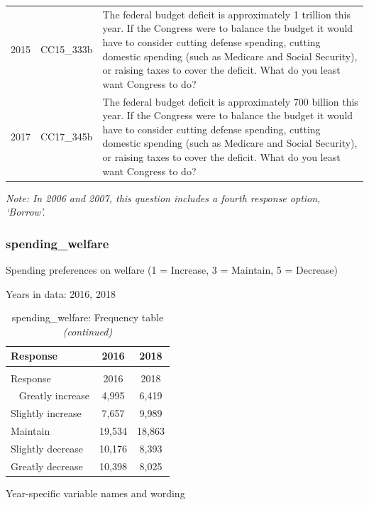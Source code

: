\documentclass[12pt]{article}
\begin{document}
\begin{longtable}[t]{rl>{\raggedright\arraybackslash}p{10cm}}
2015 & CC15\_333b & The federal budget deficit is approximately 1 trillion this year. If the Congress were to balance the budget it would have to consider cutting defense spending, cutting domestic spending (such as Medicare and Social Security), or raising taxes to cover the deficit. What do you least want Congress to do?\\
2017 & CC17\_345b & The federal budget deficit is approximately 700 billion this year. If the Congress were to balance the budget it would have to consider cutting defense spending, cutting domestic spending (such as Medicare and Social Security), or raising taxes to cover the deficit. What do you least want Congress to do?\\*
\end{longtable}

\emph{Note: In 2006 and 2007, this question includes a fourth response
option, `Borrow'.}

\subsubsection{spending\_welfare}\label{spending_welfare}

Spending preferences on welfare (1 = Increase, 3 = Maintain, 5 =
Decrease)

Years in data: 2016, 2018\begingroup\fontsize{10}{12}\selectfont

\begin{longtable}[t]{lcc}
\caption{\label{tab:unnamed-chunk-4}spending\_welfare: Frequency table}\\
\toprule
Response & 2016 & 2018\\
\midrule
\endfirsthead
\caption[]{spending\_welfare: Frequency table \textit{(continued)}}\\
\toprule
Response & 2016 & 2018\\
\midrule
\endhead
\
\endfoot
\bottomrule
\endlastfoot
Greatly increase & 4,995 & 6,419\\
Slightly increase & 7,657 & 9,989\\
Maintain & 19,534 & 18,863\\
Slightly decrease & 10,176 & 8,393\\
Greatly decrease & 10,398 & 8,025\\*
\end{longtable}

\endgroup{}

Year-specific variable names and wording
\end{document}
